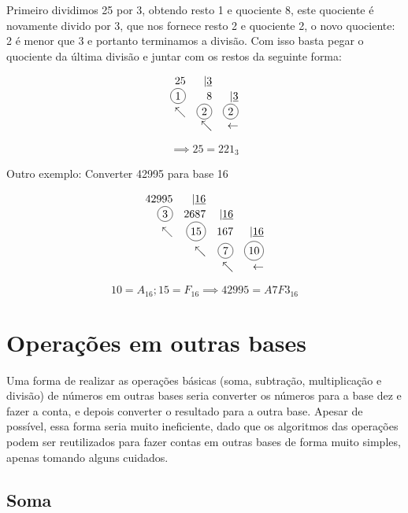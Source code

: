 \documentclass{report}
\newcommand*\circled[1]{\tikz[baseline=(char.base)]{
            \node[shape=circle,draw,inner sep=2pt] (char) {#1};}}
\theoremstyle{definition}
\begin{document}
Primeiro dividimos 25 por 3, obtendo resto 1 e quociente 8, este quociente é novamente divido por 3, que nos fornece resto 2 e quociente 2, o novo quociente: 2 é menor que 3 e portanto terminamos a divisão. Com isso basta pegar o quociente da última divisão e juntar com os restos da seguinte forma:

\[
    \begin{array}{rrr}
              25& |\underline{3}&               \\
     \circled{1}&              8& |\underline{3}\\
        \nwarrow&    \circled{2}&    \circled{2}\\
                &       \nwarrow&     \leftarrow
    \end{array}
\]

\begin{equation*}
\implies 25 = 221_3
\end{equation*}

Outro exemplo: Converter 42995 para base 16

\[
    \begin{array}{rrrr}
        42995& |\underline{16}&                &                \\
  \circled{3}&            2687& |\underline{16}&                \\
     \nwarrow&    \circled{15}&             167& |\underline{16}\\
             &        \nwarrow&     \circled{7}&    \circled{10}\\
             &                &        \nwarrow&      \leftarrow
    \end{array}
\]

$$10 = A_{16}; 15 = F_{16} \implies 42995 = A7F3_{16}$$

\section{Operações em outras bases}

Uma forma de realizar as operações básicas (soma, subtração, multiplicação e divisão) de números em outras bases seria converter os números para a base dez e fazer a conta, e depois converter o resultado para a outra base. Apesar de possível, essa forma seria muito ineficiente, dado que os algoritmos das operações podem ser reutilizados para fazer contas em outras bases de forma muito simples, apenas tomando alguns cuidados.

\subsection{Soma}
\end{document}
